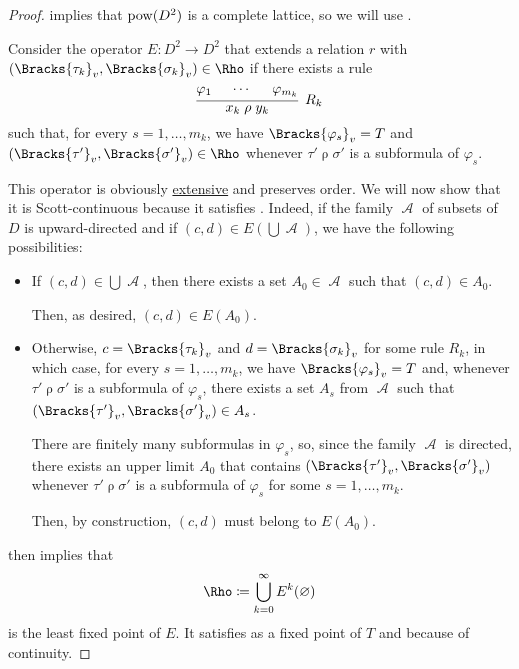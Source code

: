 \begin{proof}
   implies that \( \operatorname{pow}(D^2) \) is a complete lattice, so we will use .

  Consider the operator \( E: D^2 \to D^2 \) that extends a relation \( r \) with \( (\Bracks{\tau_k}_v, \Bracks{\sigma_k}_v) \in \Rho \) if there exists a rule
  \begin{equation*}
    \begin{prooftree}
      \hypo{ \varphi_1 }
      \hypo{ \cdots }
      \hypo{ \varphi_{m_k} }
      \infer3[\( R_k \)]{ x_k \mathrel{\rho} y_k },
    \end{prooftree}
  \end{equation*}
  such that, for every \( s = 1, \ldots, m_k \), we have \( \Bracks{\varphi_s}_v = T \) and \( (\Bracks{\tau'}_v, \Bracks{\sigma'}_v) \in \Rho \) whenever \( \tau' \mathrel{\rho} \sigma' \) is a subformula of \( \varphi_s \).

  This operator is obviously \hyperref[def:extensive_function]{extensive} and preserves order. We will now show that it is Scott-continuous because it satisfies . Indeed, if the family \( \mscrA \) of subsets of \( D \) is upward-directed and if \( (c, d) \in E(\bigcup \mscrA) \), we have the following possibilities:
  \begin{itemize}
    \item If \( (c, d) \in \bigcup \mscrA \), then there exists a set \( A_0 \in \mscrA \) such that \( (c, d) \in A_0 \).

    Then, as desired, \( (c, d) \in E(A_0) \).

    \item Otherwise, \( c = \Bracks{\tau_k}_v \) and \( d = \Bracks{\sigma_k}_v \) for some rule \( R_k \), in which case, for every \( s = 1, \ldots, m_k \), we have \( \Bracks{\varphi_s}_v = T \) and, whenever \( \tau' \mathrel{\rho} \sigma' \) is a subformula of \( \varphi_s \), there exists a set \( A_s \) from \( \mscrA \) such that \( (\Bracks{\tau'}_v, \Bracks{\sigma'}_v) \in A_s \).

    There are finitely many subformulas in \( \varphi_s \), so, since the family \( \mscrA \) is directed, there exists an upper limit \( A_0 \) that contains \( (\Bracks{\tau'}_v, \Bracks{\sigma'}_v) \) whenever \( \tau' \mathrel{\rho} \sigma' \) is a subformula of \( \varphi_s \) for some \( s = 1, \ldots, m_k \).

    Then, by construction, \( (c, d) \) must belong to \( E(A_0) \).
  \end{itemize}

   then implies that
  \begin{equation*}
    \Rho \coloneqq \bigcup_{k=0}^\infty E^k(\varnothing)
  \end{equation*}
  is the least fixed point of \( E \). It satisfies  as a fixed point of \( T \) and  because of continuity.
\end{proof}

